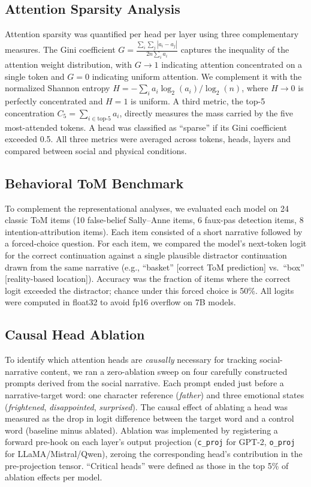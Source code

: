 \documentclass[conference]{IEEEtran}
\begin{document}
\subsection{Attention Sparsity Analysis}

Attention sparsity was quantified per head per layer using three complementary measures. The Gini coefficient \cite{hoyer2004non}
$G = \frac{\sum_{i}\sum_{j}|a_i - a_j|}{2n\sum_i a_i}$
captures the inequality of the attention weight distribution, with $G \rightarrow 1$ indicating attention concentrated on a single token and $G = 0$ indicating uniform attention. We complement it with the normalized Shannon entropy $H = -\sum_i a_i \log_2(a_i) / \log_2(n)$, where $H \rightarrow 0$ is perfectly concentrated and $H = 1$ is uniform. A third metric, the top-5 concentration $C_5 = \sum_{i \in \text{top-5}} a_i$, directly measures the mass carried by the five most-attended tokens. A head was classified as ``sparse'' if its Gini coefficient exceeded 0.5. All three metrics were averaged across tokens, heads, layers and compared between social and physical conditions.

\subsection{Behavioral ToM Benchmark}

To complement the representational analyses, we evaluated each model on 24 classic ToM items (10 false-belief Sally--Anne items, 6 faux-pas detection items, 8 intention-attribution items). Each item consisted of a short narrative followed by a forced-choice question. For each item, we compared the model's next-token logit for the correct continuation against a single plausible distractor continuation drawn from the same narrative (e.g., ``basket'' [correct ToM prediction] vs.\ ``box'' [reality-based location]). Accuracy was the fraction of items where the correct logit exceeded the distractor; chance under this forced choice is 50\%. All logits were computed in float32 to avoid fp16 overflow on 7B models.

\subsection{Causal Head Ablation}
\label{sec:methods:ablation}

To identify which attention heads are \textit{causally} necessary for tracking social-narrative content, we ran a zero-ablation sweep on four carefully constructed prompts derived from the social narrative. Each prompt ended just before a narrative-target word: one character reference (\textit{father}) and three emotional states (\textit{frightened}, \textit{disappointed}, \textit{surprised}). The causal effect of ablating a head was measured as the drop in logit difference between the target word and a control word (baseline minus ablated). Ablation was implemented by registering a forward pre-hook on each layer's output projection (\texttt{c\_proj} for GPT-2, \texttt{o\_proj} for LLaMA/Mistral/Qwen), zeroing the corresponding head's contribution in the pre-projection tensor. ``Critical heads'' were defined as those in the top 5\% of ablation effects per model.
\end{document}
